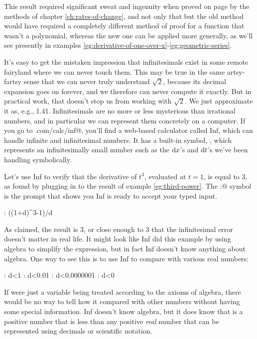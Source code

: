 This result
required significant sweat and ingenuity when proved on page \pageref{detour:polynomial-proof} by the methods of chapter \ref{ch:rates-of-change},
and not only that but the old method would have required a completely different method of proof for a function that
wasn't a polynomial, whereas the new one can be applied more generally, as we'll see presently in examples
\ref{eg:derivative-of-one-over-x}-\ref{eg:geometric-series}.

It's easy to get the mistaken impression that infinitesimals exist in some remote fairyland where we can never
touch them. This may be true in the same artsy-fartsy sense that we can never truly understand $\sqrt{2}$, because
its decimal expansion goes on forever, and we therefore can never compute it exactly. But in practical work,
that doesn't stop us from working with $\sqrt{2}$. We just approximate it as, e.g., 1.41. Infinitesimals
are no more or less mysterious than irrational numbers, and in particular we can represent them concretely on a computer.
If you go to \verb@lightandmatter.com/calc/inf@, you'll find a web-based calculator called Inf,
which can handle infinite and infinitesimal numbers. It has a built-in symbol, \verb@d@, which represents an infinitesimally
small number such as the $\operatorname{d\!} x$'s and $\operatorname{d\!} t$'s we've been handling symbolically.

Let's use Inf to verify that the derivative of $t^3$, evaluated at $t=1$, is equal to 3, as found by plugging in to
the result of example \ref{eg:third-power}. The \verb@:@ symbol is the prompt that shows you Inf is ready to accept
your typed input.

\begin{Code}
  \ii : ((1+d)^3-1)/d
\end{Code}

As claimed, the result is 3, or close enough to 3 that the infinitesimal error doesn't matter in real life.
It might look like Inf did this example by using algebra to simplify the expression, but in fact Inf doesn't
know anything about algebra. One way to see this is to use Inf to compare \verb@d@ with various real numbers:

\begin{Code}
  \ii : d<1
  \ii : d<0.01
  \ii : d<0.0000001
  \ii : d<0
\end{Code}

If \verb@d@ were just a variable being treated according to the axioms of algebra, there would be no way
to tell how it compared with other numbers without having some special information. Inf doesn't know
algebra, but it does know that \verb@d@ is a positive number that is less than any positive \emph{real} number
that can be represented using decimals or scientific notation.

